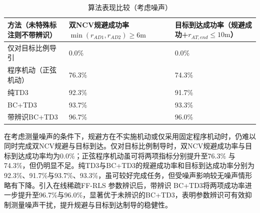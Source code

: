 \begin{table}[htbp]
\centering
\caption{算法表现比较（考虑噪声）}
\label{tab:perf-noise}
\small
\begin{tabularx}{\linewidth}{lXX}
\toprule
方法（未特殊标注则不带辨识） & 双NCV规避成功率$\min ({r_{AD1}},{r_{AD2}}) \geqslant 6{\text{m}}$ & 目标到达成功率（规避成功+${r_{AT,end}} \leqslant 10{\text{m}}$） \\
\midrule
仅对目标比例导引 & 0.0\% & 0.0\% \\
程序机动（正弦机动） & 76.3\% & 74.3\% \\
纯TD3 & 92.3\% & 91.7\% \\
BC+TD3 & 93.7\% & 93.3\% \\
带辨识BC+TD3 & 96.7\% & 96.0\% \\
\bottomrule
\end{tabularx}
\end{table}
在考虑测量噪声的条件下，规避方在不实施机动或仅采用固定程序机动时，仍难以同时完成双NCV规避与目标到达。仅对目标比例制导时，双NCV规避成功率与目标到达成功率均为0.0\%；正弦程序机动虽可将两项指标分别提升至76.3\% 与 74.3\%，但仍明显不足。纯TD3与BC+TD3的规避成功率和目标到达成功率分别为92.3\%、91.7\%与93.7\%、93.3\%，虽可较好完成任务，但受噪声影响较无噪声情形略有下降。引入在线稀疏FF-RLS 参数辨识后，带辨识 BC+TD3将两项成功率进一步提升至96.7\%与96.0\%，显著优于未辨识的BC+TD3，表明参数辨识可有效抑制测量噪声干扰，提升规避与目标到达制导的稳健性。

